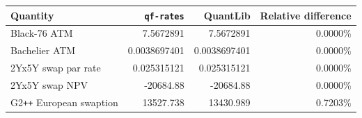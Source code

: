 \begin{tabular}{lrrr}
\toprule
Quantity & \texttt{qf-rates} & QuantLib & Relative difference \\
\midrule
Black-76 ATM & 7.5672891 & 7.5672891 & 0.0000\% \\
Bachelier ATM & 0.0038697401 & 0.0038697401 & 0.0000\% \\
2Yx5Y swap par rate & 0.025315121 & 0.025315121 & 0.0000\% \\
2Yx5Y swap NPV & -20684.88 & -20684.88 & 0.0000\% \\
G2\texttt{++} European swaption & 13527.738 & 13430.989 & 0.7203\% \\
\bottomrule
\end{tabular}

